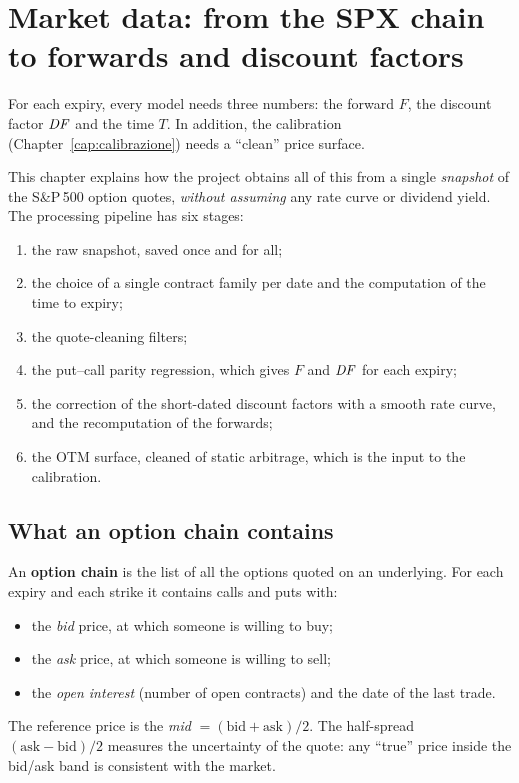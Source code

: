 \chapter{Market data: from the SPX chain to forwards and discount factors}
\label{cap:dati}

For each expiry, every model needs three numbers: the forward $F$, the discount factor $\mathit{DF}$ and the time $T$. In
addition, the calibration (Chapter~\ref{cap:calibrazione}) needs a ``clean'' price surface.

This chapter explains how the project obtains all of this from a single \emph{snapshot} of the S\&P\,500 option
quotes, \emph{without assuming} any rate curve or dividend yield. The processing pipeline has six stages:
\begin{enumerate}
\item the raw snapshot, saved once and for all;
\item the choice of a single contract family per date and the computation of the time to expiry;
\item the quote-cleaning filters;
\item the put--call parity regression, which gives $F$ and $\mathit{DF}$ for each expiry;
\item the correction of the short-dated discount factors with a smooth rate curve, and the recomputation of the
forwards;
\item the OTM surface, cleaned of static arbitrage, which is the input to the calibration.
\end{enumerate}

\section{What an option chain contains}
An \textbf{option chain} is the list of all the options quoted on an underlying. For each expiry and each strike it
contains calls and puts with:
\begin{itemize}
\item the \emph{bid} price, at which someone is willing to buy;
\item the \emph{ask} price, at which someone is willing to sell;
\item the \emph{open interest} (number of open contracts) and the date of the last trade.
\end{itemize}
The reference price is the \emph{mid} $=(\text{bid}+\text{ask})/2$. The half-spread $(\text{ask}-\text{bid})/2$
measures the uncertainty of the quote: any ``true'' price inside the bid/ask band is consistent with the market.

